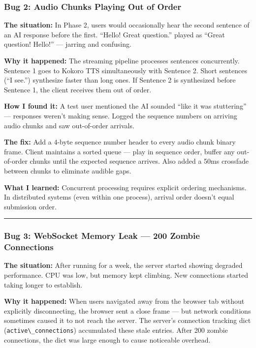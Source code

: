 \documentclass[
  11pt,
]{article}
\newcommand{\passthrough}[1]{#1}
\begin{document}
\hypertarget{bug-2-audio-chunks-playing-out-of-order}{%
\subsubsection{Bug 2: Audio Chunks Playing Out of
Order}\label{bug-2-audio-chunks-playing-out-of-order}}

\textbf{The situation:} In Phase 2, users would occasionally hear the
second sentence of an AI response before the first. ``Hello! Great
question.'' played as ``Great question! Hello!'' --- jarring and
confusing.

\textbf{Why it happened:} The streaming pipeline processes sentences
concurrently. Sentence 1 goes to Kokoro TTS simultaneously with Sentence
2. Short sentences (``I see.'') synthesize faster than long ones. If
Sentence 2 is synthesized before Sentence 1, the client receives them
out of order.

\textbf{How I found it:} A test user mentioned the AI sounded ``like it
was stuttering'' --- responses weren't making sense. Logged the sequence
numbers on arriving audio chunks and saw out-of-order arrivals.

\textbf{The fix:} Add a 4-byte sequence number header to every audio
chunk binary frame. Client maintains a sorted queue --- play in sequence
order, buffer any out-of-order chunks until the expected sequence
arrives. Also added a 50ms crossfade between chunks to eliminate audible
gaps.

\textbf{What I learned:} Concurrent processing requires explicit
ordering mechanisms. In distributed systems (even within one process),
arrival order doesn't equal submission order.

\begin{center}\rule{0.5\linewidth}{0.5pt}\end{center}

\hypertarget{bug-3-websocket-memory-leak-200-zombie-connections}{%
\subsubsection{Bug 3: WebSocket Memory Leak --- 200 Zombie
Connections}\label{bug-3-websocket-memory-leak-200-zombie-connections}}

\textbf{The situation:} After running for a week, the server started
showing degraded performance. CPU was low, but memory kept climbing. New
connections started taking longer to establish.

\textbf{Why it happened:} When users navigated away from the browser tab
without explicitly disconnecting, the browser sent a close frame --- but
network conditions sometimes caused it to not reach the server. The
server's connection tracking dict
(\passthrough{\lstinline!active\_connections!}) accumulated these stale
entries. After 200 zombie connections, the dict was large enough to
cause noticeable overhead.
\end{document}
